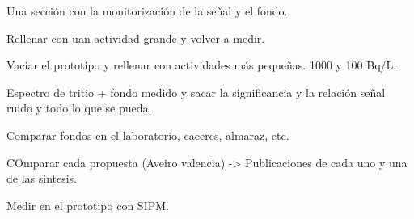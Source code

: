 Una sección con la monitorización de la señal y el fondo.

Rellenar con uan actividad grande y volver a medir. 

Vaciar el prototipo y rellenar con actividades más pequeñas. 1000 y 100 Bq/L.

Espectro de tritio + fondo medido y sacar la significancia y la relación señal ruido y todo lo que se pueda.

Comparar fondos en el laboratorio, caceres, almaraz, etc.

COmparar cada propuesta (Aveiro valencia) -> Publicaciones de cada uno y una de las sintesis.

Medir en el prototipo con SIPM.